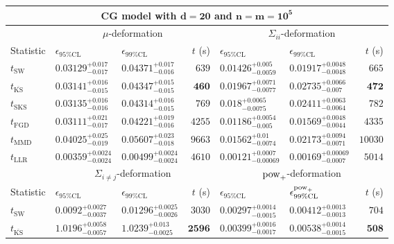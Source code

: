 \begin{tabular}{l|llr|llr}
	\toprule
	\multicolumn{7}{c}{{\bf CG model with $\mathbf{d=20}$ and $\mathbf{n=m=10^{5}}$}} \\
	\toprule
	\multicolumn{1}{c}{} & \multicolumn{3}{c}{$\mu$-deformation} & \multicolumn{3}{c}{$\Sigma_{ii}$-deformation} \\
	Statistic & $\epsilon_{95\%\mathrm{CL}}$ & $\epsilon_{99\%\mathrm    {CL}}$ & $t$ (s) & $\epsilon_{95\%\mathrm{CL}}$ & $\epsilon_{99\%\mathrm{CL}}$ & $t$ (s) \\
	\midrule
	$t_{\mathrm{SW}}$ & $0.03129_{-0.017}^{+0.017}$ & $0.04371_{-0.016}^{+0.017}$ & $639$ & $0.01426_{-0.0059}^{+0.005}$ & $0.01917_{-0.0048}^{+0.0048}$ & $665$ \\
	$t_{\overline{\mathrm{KS}}}$ & $0.03141_{-0.015}^{+0.016}$ & $0.04347_{-0.015}^{+0.015}$ & ${\mathbf{460}}$ & $0.01967_{-0.0077}^{+0.0071}$ & $0.02735_{-0.007}^{+0.0066}$ & ${\mathbf{472}}$ \\
	$t_{\mathrm{SKS}}$ & $0.03135_{-0.016}^{+0.016}$ & $0.04314_{-0.015}^{+0.016}$ & $769$ & $0.018_{-0.0075}^{+0.0065}$ & $0.02411_{-0.0064}^{+0.0063}$ & $782$ \\
	$t_{\mathrm{FGD}}$ & ${\mathbf{0.03111_{-0.017}^{+0.021}}}$ & ${\mathbf{0.04221_{-0.016}^{+0.019}}}$ & $4255$ & ${\mathbf{0.01186_{-0.005}^{+0.0054}}}$ & ${\mathbf{0.01569_{-0.0044}^{+0.0048}}}$ & $4335$ \\
	$t_{\mathrm{MMD}}$ & $0.04025_{-0.019}^{+0.025}$ & $0.05607_{-0.018}^{+0.023}$ & $9663$ & $0.01562_{-0.0074}^{+0.01}$ & $0.02173_{-0.0071}^{+0.0094}$ & $10030$ \\
	$t_{\mathrm{LLR}}$ & $0.00359_{-0.0024}^{+0.0024}$ & $0.00499_{-0.0024}^{+0.0024}$ & $4610$ & $0.00121_{-0.00069}^{+0.0007}$ & $0.00169_{-0.0007}^{+0.00069}$ & $5014$ \\
	\toprule
	\multicolumn{1}{c}{} & \multicolumn{3}{c}{$\Sigma_{i\neq j}$-deformation} & \multicolumn{3}{c}{$\rm{pow}_{+}$-deformation} \\
	Statistic & $\epsilon_{95\%\mathrm{CL}}$ & $\epsilon_{99\%\mathrm{CL}}$ & $t$ (s) & $\epsilon_{95\%\mathrm{CL}}$ & $\epsilon^{\rm   {pow}_{+}}_{99\%\mathrm{CL}}$ & $t$ (s) \\
	\midrule
	$t_{\mathrm{SW}}$ & $0.0092_{-0.0037}^{+0.0027}$ & $0.01296_{-0.0026}^{+0.0025}$ & $3030$ & $0.00297_{-0.0015}^{+0.0014}$ & $0.00412_{-0.0013}^{+0.0013}$ & $704$ \\
	$t_{\overline{\mathrm{KS}}}$ & $1.0196_{-0.0057}^{+0.0058}$ & $1.0239_{-0.0025}^{+0.013}$ & ${\mathbf{2596}}$ & $0.00399_{-0.0017}^{+0.0016}$ & $0.00538_{-0.0015}^{+0.0014}$ & ${\mathbf{508}}$ \\

\end{tabular}
